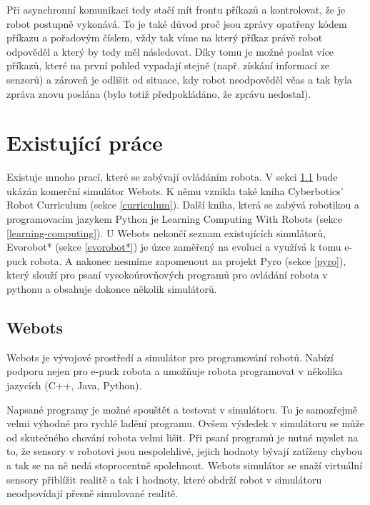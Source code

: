 \documentclass[12pt,notitlepage]{report}
\begin{document}
    Při asynchronní komunikaci tedy stačí mít frontu příkazů a kontrolovat, že
    je robot postupně vykonává. To je také důvod proč jsou zprávy opatřeny
    kódem příkazu a pořadovým číslem, vždy tak víme na který příkaz právě robot
    odpověděl a který by tedy měl následovat. Díky tomu je možné poslat více
    příkazů, které na první pohled vypadají stejně (např. získání informací ze
    senzorů) a zároveň je odlišit od situace, kdy robot neodpověděl včas a tak
    byla zpráva znovu poslána (bylo totiž předpokládáno, že zprávu nedostal).

    \section{Existující práce}

        Existuje mnoho prací, které se zabývají ovládáním robota. V sekci
        \ref{webots} bude ukázán komerční simulátor Webots. K němu vznikla také
        kniha Cyberbotics' Robot Curriculum (sekce \ref{curriculum}). Další
        kniha, která se zabývá robotikou a programovacím jazykem Python je
        Learning Computing With Robots (sekce \ref{learning-computing}). U
        Webots nekončí seznam existujících simulátorů, Evorobot* (sekce
        \ref{evorobot*}) je úzce zaměřený na evoluci a využívá k tomu e-puck
        robota. A nakonec nesmíme zapomenout na projekt Pyro (sekce
        \ref{pyro}), který slouží pro psaní vysokoúrovňových programů pro
        ovládání robota v pythonu a obsahuje dokonce několik simulátorů.

        \subsection{Webots}
        \label{webots}

        Webots\cite{webots} je vývojové prostředí a simulátor pro programování robotů.
        Nabízí podporu nejen pro e-puck robota a umožňuje robota programovat v
        několika jazycích (C++, Java, Python).

        Napsané programy je možné spouštět a testovat v simulátoru. To je
        samozřejmě velmi výhodné pro rychlé ladění programu. Ovšem výsledek v
        simulátoru se může od skutečného chování robota velmi lišit. Při psaní
        programů je nutné myslet na to, že sensory v robotovi jsou
        nespolehlivé, jejich hodnoty bývají zatíženy chybou a tak se na ně nedá
        stoprocentně spolehnout. Webots simulátor se snaží virtuální sensory
        přiblížit realitě a tak i hodnoty, které obdrží robot v simulátoru
        neodpovídají přesně simulované realitě.
\end{document}
